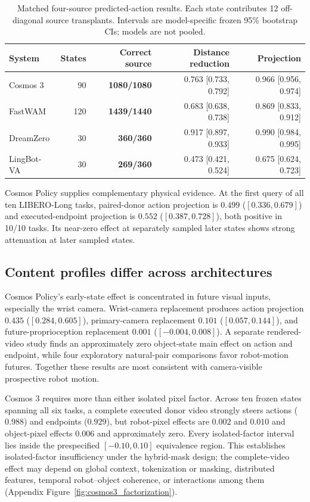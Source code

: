\begin{table}[H]
  \caption{Matched four-source predicted-action results. Each state contributes 12 off-diagonal source transplants. Intervals are model-specific frozen 95\% bootstrap CIs; models are not pooled.}
  \label{tab:crossmodel}
  \centering
  \scriptsize
  \setlength{\tabcolsep}{3.0pt}
  \begin{tabular}{@{}lrrrr@{}}
    \toprule
    System & States & Correct source & Distance reduction & Projection \\
    \midrule
    Cosmos 3 & 90 & \textbf{1080/1080} & 0.763 [0.733, 0.792] & 0.966 [0.956, 0.974] \\
    FastWAM & 120 & \textbf{1439/1440} & 0.683 [0.638, 0.738] & 0.869 [0.833, 0.912] \\
    DreamZero & 30 & \textbf{360/360} & 0.917 [0.897, 0.933] & 0.990 [0.984, 0.995] \\
    LingBot-VA & 30 & \textbf{269/360} & 0.473 [0.421, 0.524] & 0.675 [0.624, 0.723] \\
    \bottomrule
  \end{tabular}
\end{table}

Cosmos Policy supplies complementary physical evidence. At the first query of all ten LIBERO-Long tasks, paired-donor action projection is $0.499$ ($[0.336,0.679]$) and executed-endpoint projection is $0.552$ ($[0.387,0.728]$), both positive in 10/10 tasks. Its near-zero effect at separately sampled later states shows strong attenuation at later sampled states.

\subsection{Content profiles differ across architectures}
\label{sec:content}

Cosmos Policy's early-state effect is concentrated in future visual inputs, especially the wrist camera. Wrist-camera replacement produces action projection $0.435$ ($[0.284,0.605]$), primary-camera replacement $0.101$ ($[0.057,0.144]$), and future-proprioception replacement $0.001$ ($[-0.004,0.008]$). A separate rendered-video study finds an approximately zero object-state main effect on action and endpoint, while four exploratory natural-pair comparisons favor robot-motion futures. Together these results are most consistent with camera-visible prospective robot motion.

Cosmos 3 requires more than either isolated pixel factor. Across ten frozen states spanning all six tasks, a complete executed donor video strongly steers actions ($0.988$) and endpoints ($0.929$), but robot-pixel effects are $0.002$ and $0.010$ and object-pixel effects $0.006$ and approximately zero. Every isolated-factor interval lies inside the prespecified $[-0.10,0.10]$ equivalence region. This establishes isolated-factor insufficiency under the hybrid-mask design; the complete-video effect may depend on global context, tokenization or masking, distributed features, temporal robot--object coherence, or interactions among them (Appendix Figure~\ref{fig:cosmos3_factorization}).

